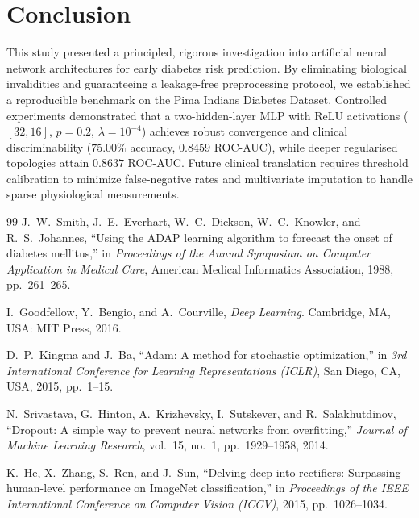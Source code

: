 \documentclass[11pt,a4paper]{article}
\begin{document}
\section{Conclusion}
\label{sec:conclusion}
This study presented a principled, rigorous investigation into artificial neural network architectures for early diabetes risk prediction. By eliminating biological invalidities and guaranteeing a leakage-free preprocessing protocol, we established a reproducible benchmark on the Pima Indians Diabetes Dataset. Controlled experiments demonstrated that a two-hidden-layer MLP with ReLU activations ($[32, 16]$, $p=0.2$, $\lambda=10^{-4}$) achieves robust convergence and clinical discriminability ($75.00\%$ accuracy, $0.8459$ ROC-AUC), while deeper regularised topologies attain $0.8637$ ROC-AUC. Future clinical translation requires threshold calibration to minimize false-negative rates and multivariate imputation to handle sparse physiological measurements.

\begin{thebibliography}{99}
J.~W.~Smith, J.~E.~Everhart, W.~C.~Dickson, W.~C.~Knowler, and R.~S.~Johannes, ``Using the ADAP learning algorithm to forecast the onset of diabetes mellitus,'' in \emph{Proceedings of the Annual Symposium on Computer Application in Medical Care}, American Medical Informatics Association, 1988, pp.~261--265.

I.~Goodfellow, Y.~Bengio, and A.~Courville, \emph{Deep Learning}. Cambridge, MA, USA: MIT Press, 2016.

D.~P.~Kingma and J.~Ba, ``Adam: A method for stochastic optimization,'' in \emph{3rd International Conference for Learning Representations (ICLR)}, San Diego, CA, USA, 2015, pp.~1--15.

N.~Srivastava, G.~Hinton, A.~Krizhevsky, I.~Sutskever, and R.~Salakhutdinov, ``Dropout: A simple way to prevent neural networks from overfitting,'' \emph{Journal of Machine Learning Research}, vol.~15, no.~1, pp.~1929--1958, 2014.

K.~He, X.~Zhang, S.~Ren, and J.~Sun, ``Delving deep into rectifiers: Surpassing human-level performance on ImageNet classification,'' in \emph{Proceedings of the IEEE International Conference on Computer Vision (ICCV)}, 2015, pp.~1026--1034.
\end{thebibliography}
\end{document}

